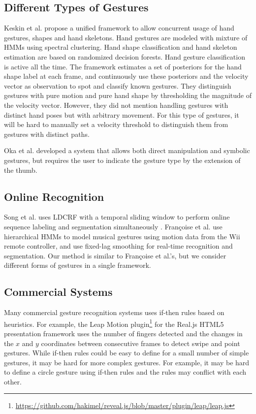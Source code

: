 \documentclass[conference]{IEEEtran}
\begin{document}
\subsection{Different Types of Gestures}
Keskin et al. \cite{keskin12} propose a unified framework to allow concurrent
usage of hand gestures, shapes and hand skeletons. Hand gestures are modeled
with mixture of HMMs using spectral clustering. Hand shape classification and
hand skeleton estimation are based on randomized decision forests. Hand
gesture classification is active all the time. The framework estimates a set of
posteriors for the hand shape label at each frame, and continuously use these
posteriors and the velocity vector as observation to spot and classify known
gestures. They distinguish gestures with pure motion and pure hand shape by
thresholding the magnitude of the velocity vector. However, they did not mention
handling gestures with distinct hand poses but with arbitrary movement. For this
type of gestures, it will be hard to manually set a velocity threshold to
distinguish them from gestures with distinct paths.

Oka et al. \cite{Oka02} developed a system that
allows both direct manipulation and symbolic gestures, but requires the user to
indicate the gesture type by the extension of the thumb.

\subsection{Online Recognition}
Song et al. uses LDCRF with a temporal sliding window to perform
online sequence labeling and segmentation simultaneously \cite{song12}. 
Fran{\c{c}}oise et al. \cite{francoise11} use hierarchical HMMs to model musical
gestures using motion data from the Wii remote controller, and use fixed-lag
smoothing for real-time recognition and segmentation.
Our method is similar to Fran{\c{c}}oise et al.'s, but we consider different
forms of gestures in a single framework.

\subsection{Commercial Systems}
Many commercial gesture recognition systems uses if-then rules based on
heuristics. For example, the Leap Motion
plugin\footnote{\url{https://github.com/hakimel/reveal.js/blob/master/plugin/leap/leap.js}} for the Real.js HTML5 presentation
 framework uses the number of fingers
detected and the changes in the $x$ and $y$ coordinates between consecutive
frames to detect swipe and point gestures. While if-then rules could be easy to define for
a small number of simple gestures, it may be hard for more complex gestures.
For example, it may be hard to define a circle gesture using if-then rules and
the rules may conflict with each other.
\end{document}
